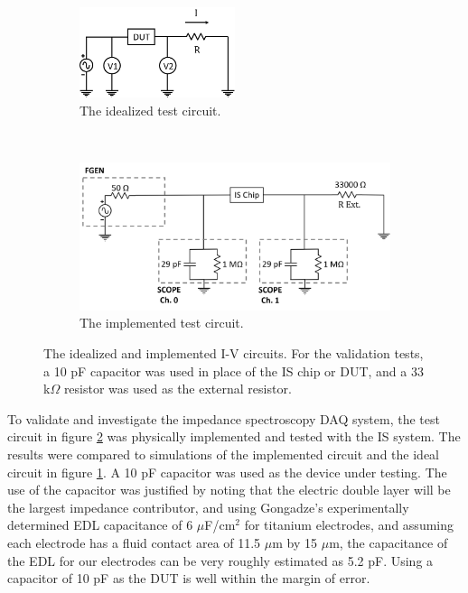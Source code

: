 \begin{figure}[h]
\centering
    \begin{subfigure}[b]{\textwidth}
        \centering
        \includegraphics[width=0.5\textwidth]{images/I-VMethod.png}
        \caption{The idealized test circuit.}
        \label{fig:IS_DAQ_test_circuit_ideal}
    \end{subfigure}
    \\
    \vspace{0.1 in}
    \begin{subfigure}[b]{0.85\textwidth}
        \centering
        \includegraphics[width=\textwidth]{images/method_I-V.png}
        \caption{The implemented test circuit.}
        \label{fig:IS_DAQ_test_circuit_implemented}
    \end{subfigure}
    \caption{The idealized and implemented I-V circuits. For the validation tests, a 10 pF capacitor was used in place of the IS chip or DUT, and a 33 k$\Omega$ resistor was used as the external resistor.}
    \label{fig:IS_DAQ_test_circuit}
\end{figure}

\par To validate and investigate the impedance spectroscopy DAQ system, the test circuit in figure \ref{fig:IS_DAQ_test_circuit_implemented} was physically implemented and tested with the IS system. The results were compared to simulations of the implemented circuit and the ideal circuit in figure \ref{fig:IS_DAQ_test_circuit_ideal}. A 10 pF capacitor was used as the device under testing. The use of the capacitor was justified by noting that the electric double layer will be the largest impedance contributor, and using Gongadze's \cite{_gongadze.pdf_????} experimentally determined EDL capacitance of 6 $\mu$F/cm$^2$ for titanium electrodes, and assuming each electrode has a fluid contact area of 11.5 $\mu$m by 15 $\mu$m, the capacitance of the EDL for our electrodes can be very roughly estimated as 5.2 pF. Using a capacitor of 10 pF as the DUT is well within the margin of error.  

